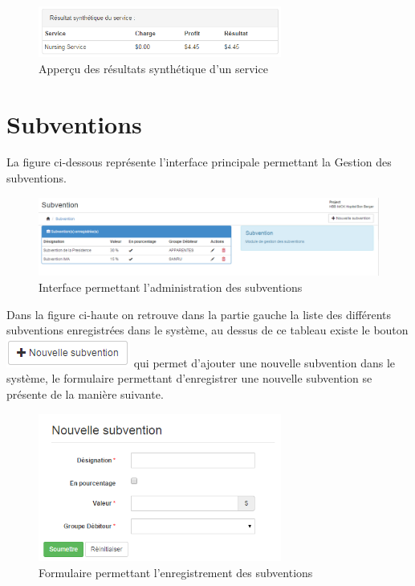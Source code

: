 \documentclass[12pt,a4paper]{report}
\begin{document}
\begin{figure}[h]
\begin{center}
\includegraphics[width=8cm]{pic/SynthetiqueService.png}
\end{center}
\caption{Apperçu des résultats synthétique d'un service}
\label{Apperçu des résultats synthétique d'un service}
\end{figure} 


\newpage
\section{Subventions}
La figure ci-dessous représente l'interface principale permettant la Gestion des subventions. 
\begin{figure}[h]
\begin{center}
\includegraphics[width=12cm]{pic/MainSubvention.png}
\end{center}
\caption{Interface permettant l'administration des subventions}
\label{Interface permettant l'administration des subventions}
\end{figure}

Dans la figure ci-haute on retrouve dans la partie gauche la liste des différents subventions enregistrées dans le système, au dessus de ce tableau existe le bouton \includegraphics[scale=1]{pic/NewSubvention.png} qui permet d'ajouter une nouvelle subvention dans le système, le formulaire permettant d'enregistrer une nouvelle subvention se présente de la manière suivante.

\begin{figure}[h]
\begin{center}
\includegraphics[width=8cm]{pic/FormSubvention.png}
\end{center}
\caption{Formulaire permettant l'enregistrement des subventions}
\label{Formulaire permettant l'enregistrement des subventions}
\end{figure} 
\end{document}
